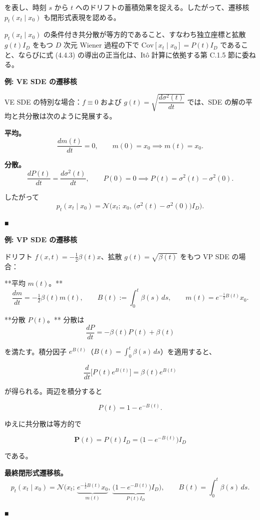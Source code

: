 を表し、時刻 $s$ から $t$ へのドリフトの蓄積効果を捉える。したがって、遷移核 $p_t(x_t\mid x_0)$ も閉形式表現を認める。

$p_t(x_t\mid x_0)$ の条件付き共分散が等方的であること、すなわち独立座標と拡散 $g(t)I_D$ をもつ $D$ 次元 Wiener 過程の下で $\mathrm{Cov}[x_t\mid x_0]=P(t)I_D$ であること、ならびに式 (4.4.3) の導出の正当化は、Itô 計算に依拠する第 C.1.5 節に委ねる。

\textbf{例: VE SDE の遷移核}

VE SDE の特別な場合：$f\equiv 0$ および $g(t)=\sqrt{\dfrac{d\sigma^2(t)}{dt}}$ では、SDE の解の平均と共分散は次のように発展する。

\textbf{平均。}
\[
\frac{dm(t)}{dt}=0, \qquad m(0)=x_0
\implies m(t)=x_0.
\]


\textbf{分散。}
\[
\frac{dP(t)}{dt}=\frac{d\sigma^2(t)}{dt}, \qquad P(0)=0
\implies P(t)=\sigma^2(t)-\sigma^2(0).
\]


したがって
\[
p_t(x_t\mid x_0)=\mathcal{N}\bigl(x_t;\, x_0,\, \bigl(\sigma^2(t)-\sigma^2(0)\bigr)I_D\bigr).
\]


■

\textbf{例: VP SDE の遷移核}

ドリフト $f(x,t)=-\tfrac12\beta(t)x$、拡散 $g(t)=\sqrt{\beta(t)}$ をもつ VP SDE の場合：

**平均 $m(t)$。**
\[
\frac{dm}{dt}=-\tfrac12\beta(t)m(t), \qquad
B(t):=\int_0^t\beta(s)\, ds, \qquad
m(t)=e^{-\tfrac12 B(t)}x_0.
\]


**分散 $P(t)$。** 分散は
\[
\frac{dP}{dt}=-\beta(t)P(t)+\beta(t)
\]

を満たす。積分因子 $e^{B(t)}$（$B(t)=\int_0^t\beta(s)\,ds$）を適用すると、

\[
\frac{d}{dt}\bigl[P(t)e^{B(t)}\bigr]=\beta(t)e^{B(t)}
\]


が得られる。両辺を積分すると

\[
P(t)=1-e^{-B(t)}.
\]


ゆえに共分散は等方的で

\[
\mathbf{P}(t)=P(t)I_D=\bigl(1-e^{-B(t)}\bigr)I_D
\]


である。

\textbf{最終閉形式遷移核。}
\[
p_t(x_t\mid x_0)
=\mathcal{N}\Biggl(
x_t;\,
\underbrace{e^{-\tfrac12 B(t)}x_0}_{m(t)},\,
\underbrace{\bigl(1-e^{-B(t)}\bigr)I_D}_{P(t)I_D}
\Biggr),
\qquad
B(t)=\int_0^t\beta(s)\, ds.
\]


■

